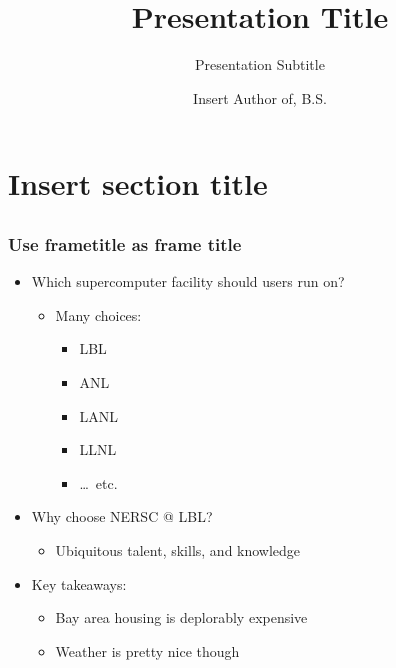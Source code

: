 \documentclass[xcolor=dvipsnames,compress,10pt]{nersc}
\title[Short Title]{Presentation Title}
\subtitle{Presentation Subtitle}
\author[Short Author]{{\Large Insert Author of, B.S.} \\
\email{doctorwho@lbl.gov}}
\begin{document}
%
\begin{frame}[label=title,plain]
    \maketitle
\end{frame}

%
\section{Insert section title}

%
\subsection{}
\begin{frame}[t]
\frametitle{Use frametitle as frame title}
    \begin{itemize}
        \item Which supercomputer facility should users run on?
        \begin{itemize}
            \item Many choices:
            \begin{itemize}
                \item LBL
                \item ANL
                \item LANL
                \item LLNL
                \item \dots~etc.
            \end{itemize}
        \end{itemize}
        \item Why choose NERSC @ LBL?
        \begin{itemize}
            \item Ubiquitous talent, skills, and knowledge
        \end{itemize}
        \item Key takeaways:
        \begin{itemize}
            \item Bay area housing is deplorably expensive
            \item Weather is pretty nice though
        \end{itemize}
    \end{itemize}
\end{frame}
\end{document}
